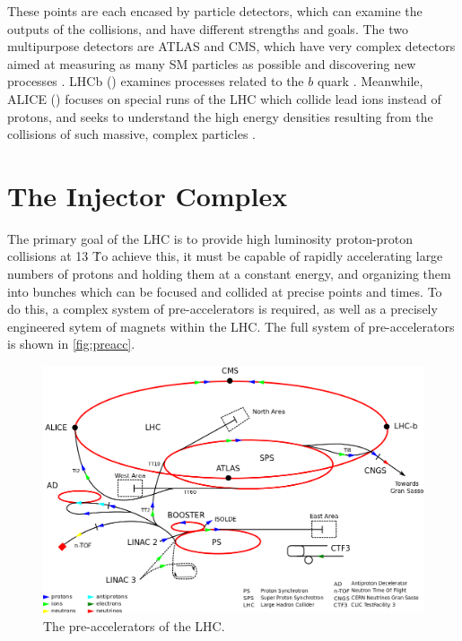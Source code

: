 These points are each encased by particle detectors, which can examine the outputs of the collisions, and have different strengths and goals. The two multipurpose detectors are \ac{ATLAS} and \ac{CMS}, which have very complex detectors aimed at measuring as many \ac{SM} particles as possible and discovering new processes \cite{PERF-2007-01, 1748-0221-3-08-S08004}. \acs{LHCb} () examines processes related to the $b$ quark \cite{1748-0221-3-08-S08005}. Meanwhile, \acs{ALICE} () focuses on special runs of the \ac{LHC} which collide lead ions instead of protons, and seeks to understand the high energy densities resulting from the collisions of such massive, complex particles \cite{1748-0221-3-08-S08002}. 


\section{The Injector Complex}
\label{sec:lhc_inj}

The primary goal of the \ac{LHC} is to provide high luminosity proton-proton collisions at 13 \tev\. %
To achieve this, it must be capable of rapidly accelerating large numbers of protons and holding them at a constant energy, and organizing them into bunches which can be focused and collided at precise points and times. To do this, a complex system of pre-accelerators is required, as well as a precisely engineered sytem of magnets within the \ac{LHC}. The full system of pre-accelerators is shown in \autoref{fig:preacc}.

\begin{centering}
\begin{figure}[!hbt]
\myfloatalign
\includegraphics[width=.90\linewidth]{figures/lhc/Cern-accelerator-complex.png}
\caption{The pre-accelerators of the \ac{LHC}.}
\label{fig:preacc}
\end{figure}
\end{centering}

